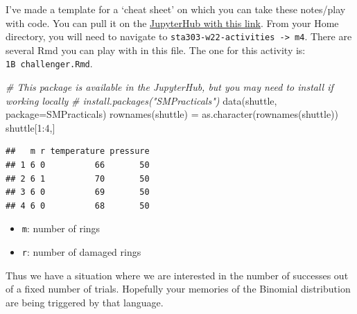 \documentclass[
  openany]{book}
\newenvironment{Shaded}{\begin{snugshade}}{\end{snugshade}}
\newcommand{\AttributeTok}[1]{\textcolor[rgb]{0.77,0.63,0.00}{#1}}
\newcommand{\CommentTok}[1]{\textcolor[rgb]{0.56,0.35,0.01}{\textit{#1}}}
\newcommand{\DecValTok}[1]{\textcolor[rgb]{0.00,0.00,0.81}{#1}}
\newcommand{\FunctionTok}[1]{\textcolor[rgb]{0.00,0.00,0.00}{#1}}
\newcommand{\NormalTok}[1]{#1}
\newcommand{\OtherTok}[1]{\textcolor[rgb]{0.56,0.35,0.01}{#1}}
\newcommand{\SpecialCharTok}[1]{\textcolor[rgb]{0.00,0.00,0.00}{#1}}
\newcommand{\StringTok}[1]{\textcolor[rgb]{0.31,0.60,0.02}{#1}}
\providecommand{\tightlist}{%
  \setlength{\itemsep}{0pt}\setlength{\parskip}{0pt}}
\begin{document}
I've made a template for a `cheat sheet' on which you can take these
notes/play with code. You can pull it on the \href{https://jupyter.utoronto.ca/hub/user-redirect/git-pull?repo=https\%3A\%2F\%2Fgithub.com\%2Fsta303-bolton\%2Fsta303-w22-activities\&urlpath=rstudio\%2F}{JupyterHub with this
link}.
From your Home directory, you will need to navigate to
\texttt{sta303-w22-activities\ -\textgreater{}\ m4}. There are several Rmd you can play with
in this file. The one for this activity is: \texttt{1B\ challenger.Rmd}.

\begin{Shaded}
\begin{Highlighting}[]
\CommentTok{\# This package is available in the JupyterHub, but you may need to install if working locally}
\CommentTok{\# install.packages("SMPracticals")}
\FunctionTok{data}\NormalTok{(}\StringTok{\textquotesingle{}shuttle\textquotesingle{}}\NormalTok{, }\AttributeTok{package=}\StringTok{\textquotesingle{}SMPracticals\textquotesingle{}}\NormalTok{)}
\FunctionTok{rownames}\NormalTok{(shuttle) }\OtherTok{=} \FunctionTok{as.character}\NormalTok{(}\FunctionTok{rownames}\NormalTok{(shuttle))}
\NormalTok{shuttle[}\DecValTok{1}\SpecialCharTok{:}\DecValTok{4}\NormalTok{,]}
\end{Highlighting}
\end{Shaded}

\begin{verbatim}
##   m r temperature pressure
## 1 6 0          66       50
## 2 6 1          70       50
## 3 6 0          69       50
## 4 6 0          68       50
\end{verbatim}

\begin{itemize}
\tightlist
\item
  \texttt{m}: number of rings
\item
  \texttt{r}: number of damaged rings
\end{itemize}

Thus we have a situation where we are interested in the number of
successes out of a fixed number of trials. Hopefully your memories of
the Binomial distribution are being triggered by that language.

\begin{Shaded}
\end{Shaded}
\end{document}
